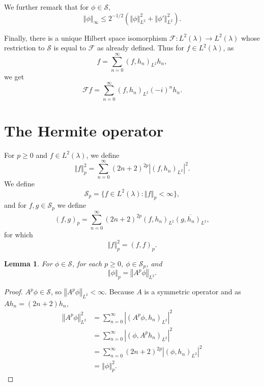 \documentclass{article}
\newcommand{\norm}[1]{\left\Vert #1 \right\Vert}
\newtheorem{lemma}[theorem]{Lemma}
\theoremstyle{definition}
\begin{document}
We further remark that for $\phi \in \mathscr{S}$,
\begin{equation}
\norm{\phi}_{\infty} \leq 2^{-1/2}(\norm{\phi}_{L^2}^2+\norm{\phi'}_{L^2}^2).
\label{supremum}
\end{equation}

Finally, there is a unique Hilbert space isomorphism $\mathscr{F}:L^2(\lambda) \to L^2(\lambda)$ whose
restriction to $\mathscr{S}$ is equal to $\mathscr{F}$ as already defined. Thus for $f \in L^2(\lambda)$, as
\[
f=\sum_{n=0}^\infty (f,h_n)_{L^2} h_n,
\]
we get
\[
\mathscr{F}f = \sum_{n=0}^\infty (f,h_n)_{L^2} (-i)^n h_n.
\]


\section{The Hermite operator}
For $p \geq 0$ and $f \in L^2(\lambda)$, we define
\[
\norm{f}_p^2 = \sum_{n=0}^\infty (2n+2)^{2p} |(f,h_n)_{L^2}|^2.
\]
We define 
\[
\mathscr{S}_p = \{f \in L^2(\lambda): \norm{f}_p < \infty\},
\]
and for $f,g \in \mathscr{S}_p$ we define
\[
(f,g)_p = \sum_{n=0}^\infty (2n+2)^{2p} (f,h_n)_{L^2} \overline{(g,h_n)_{L^2}},
\]
for which
\[
\norm{f}_p^2 = (f,f)_p. 
\]

\begin{lemma}
For $\phi \in \mathscr{S}$, for each $p \geq 0$, $\phi \in \mathscr{S}_p$,
and 
\[
\norm{\phi}_p = \norm{A^p \phi}_{L^2}.
\]
\label{phermite}
\end{lemma}
\begin{proof}
$A^p \phi \in \mathscr{S}$, so
$\norm{A^p \phi}_{L^2}<\infty$. 
Because $A$ is a symmetric operator and
as $Ah_n=(2n+2) h_n$,
\begin{align*}
\norm{A^p\phi}_{L^2}^2&=\sum_{n=0}^\infty |(A^p\phi,h_n)_{L^2}|^2\\
&=\sum_{n=0}^\infty |(\phi,A^ph_n)_{L^2}|^2\\
&=\sum_{n=0}^\infty (2n+2)^{2p} |(\phi,h_n)_{L^2}|^2\\
&=\norm{\phi}_p^2.
\end{align*}
\end{proof}
\end{document}
